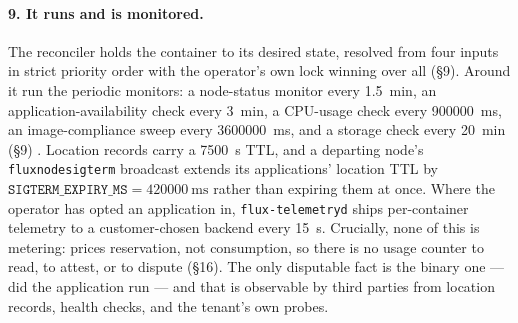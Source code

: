 \paragraph{9. It runs and is monitored.}
The reconciler holds the container to its desired state, resolved from four inputs in strict priority
order with the operator's own lock winning over all (\S9). Around it run the periodic monitors: a
node-status monitor every \SI{1.5}{\minute}, an application-availability check every
\SI{3}{\minute}, a CPU-usage check every \SI{900000}{\milli\second}, an image-compliance sweep every
\SI{3600000}{\milli\second}, and a storage check every \SI{20}{\minute} (\S9)
. Location records carry a
\SI{7500}{\second} TTL, and a departing node's \texttt{fluxnodesigterm} broadcast extends its
applications' location TTL by $\texttt{SIGTERM\_EXPIRY\_MS} = \SI{420000}{\milli\second}$ rather than
expiring them at once. Where the operator has opted an application in, \texttt{flux-\allowbreak{}telemetryd} ships
per-container telemetry to a customer-chosen backend every \SI{15}{\second}. Crucially, none of this
is metering: \Flux prices reservation, not consumption, so there is no usage counter to read, to
attest, or to dispute (\S16). The only disputable fact is the binary one --- did the application run
--- and that is observable by third parties from location records, \FDM health checks, and the
tenant's own probes.

